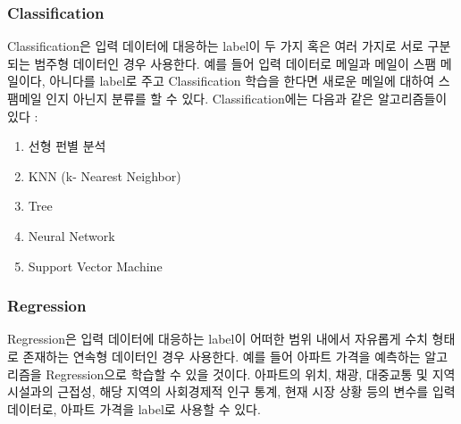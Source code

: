     \subsubsection*{Classification}
    Classification은 입력 데이터에 대응하는 label이 두 가지 혹은 여러 가지로 서로 구분되는 범주형 데이터인 경우 사용한다. 예를 들어 입력 데이터로 메일과 메일이 스팸 메일이다, 아니다를 label로 주고 Classification 학습을 한다면 새로운 메일에 대하여 스팸메일 인지 아닌지 분류를 할 수 있다.  Classification에는 다음과 같은 알고리즘들이 있다 : 
    \begin{enumerate}
        \item 선형 펀별 분석
        \item KNN (k- Nearest Neighbor)
        \item Tree 
        \item Neural Network
        \item Support Vector Machine 
    \end{enumerate}
    
    \subsubsection*{Regression}
    Regression은 입력 데이터에 대응하는 label이 어떠한 범위 내에서 자유롭게 수치 형태로 존재하는 연속형 데이터인 경우 사용한다. 예를 들어 아파트 가격을 예측하는 알고리즘을 Regression으로 학습할 수 있을 것이다. 아파트의 위치, 채광, 대중교통 및 지역 시설과의 근접성, 해당 지역의 사회경제적 인구 통계, 현재 시장 상황 등의 변수를 입력 데이터로, 아파트 가격을 label로 사용할 수 있다.